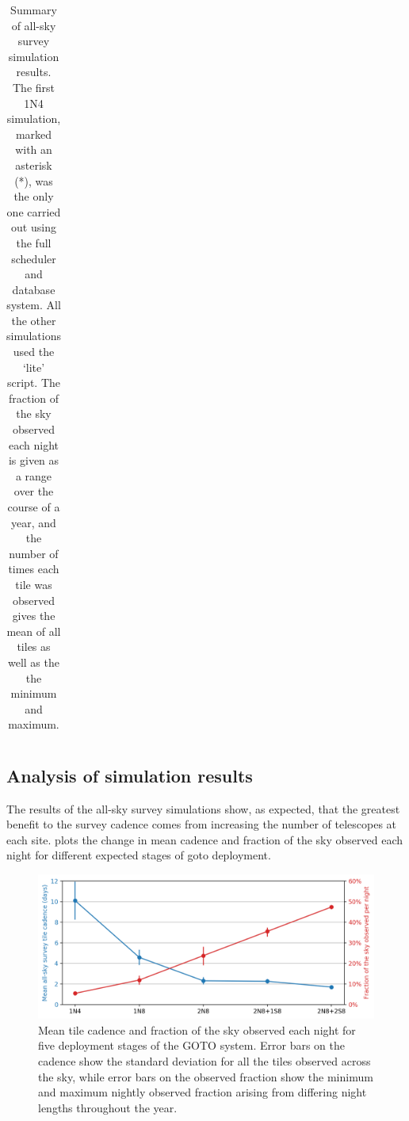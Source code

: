 \begin{colsection}
\begin{colsection}
\begin{table}[t]
\begin{center}
\begin{tabular}{c|cc|c|c|c}
    \end{tabular}
    \end{center}
    \caption[All-sky survey simulation results summary table]{
        Summary of all-sky survey simulation results. The first 1N4 simulation, marked with an asterisk (*), was the only one carried out using the full scheduler and database system. All the other simulations used the `lite' script. The fraction of the sky observed each night is given as a range over the course of a year, and the number of times each tile was observed gives the mean of all tiles as well as the the minimum and maximum.
    }\label{tab:survey_sim_results}
\end{table}

\end{colsection}


\subsection{Analysis of simulation results}
\label{sec:survey_sim_analysis}
\begin{colsection}

The results of the all-sky survey simulations show, as expected, that the greatest benefit to the survey cadence comes from increasing the number of telescopes at each site.  plots the change in mean cadence and fraction of the sky observed each night for different expected stages of \gls{goto} deployment.

\begin{figure}[t]
    \begin{center}
        \includegraphics[width=\linewidth]{images/survey_sims/results.png}
    \end{center}
    \caption[Tile cadence and nightly sky observation for different GOTO systems]{
        Mean tile cadence and fraction of the sky observed each night for five deployment stages of the GOTO system. Error bars on the cadence show the standard deviation for all the tiles observed across the sky, while error bars on the observed fraction show the minimum and maximum nightly observed fraction arising from differing night lengths throughout the year.
    }\label{fig:survey_sim_results}
\end{figure}


\end{colsection}
\end{colsection}
